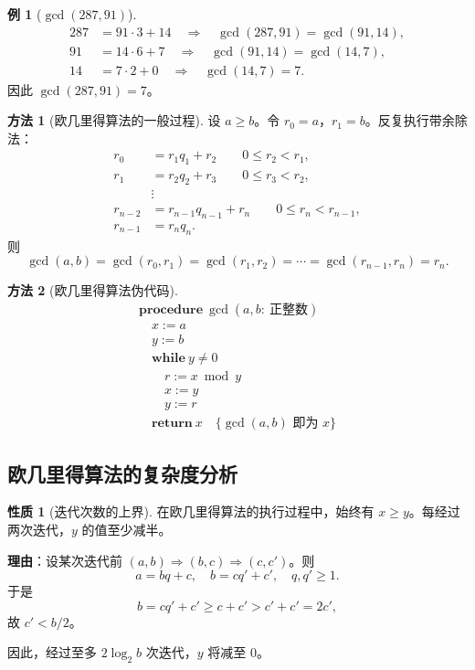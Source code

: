 \documentclass[UTF8,11pt,a4paper]{ctexbook}   %
\theoremstyle{definition}
\newtheorem{example}{例}[section]
\newtheorem{property}{性质}[section]
\newtheorem{method}{方法}[section]
\begin{document}
\begin{example}[$\gcd(287,91)$]
\begin{align*}
287 &= 91\cdot 3 + 14 \quad\Rightarrow\quad \gcd(287,91)=\gcd(91,14),\\
91 &= 14\cdot 6 + 7 \quad\Rightarrow\quad \gcd(91,14)=\gcd(14,7),\\
14 &= 7\cdot 2 + 0 \quad\Rightarrow\quad \gcd(14,7)=7.
\end{align*}
因此 $\gcd(287,91)=7$。
\end{example}

\begin{method}[欧几里得算法的一般过程]
设 $a\ge b$。令 $r_0=a$，$r_1=b$。反复执行带余除法：
\begin{align*}
r_0 &= r_1 q_1 + r_2 \qquad 0\le r_2 < r_1,\\
r_1 &= r_2 q_2 + r_3 \qquad 0\le r_3 < r_2,\\
&\vdots\\
r_{n-2} &= r_{n-1} q_{n-1} + r_n \qquad 0\le r_n < r_{n-1},\\
r_{n-1} &= r_n q_n.
\end{align*}
则
\[
\gcd(a,b)=\gcd(r_0,r_1)=\gcd(r_1,r_2)=\cdots=\gcd(r_{n-1},r_n)=r_n.
\]
\end{method}

\begin{method}[欧几里得算法伪代码]
\[
\begin{array}{l}
\textbf{procedure}\ \gcd(a,b:\ \text{正整数})\\
\quad x := a\\
\quad y := b\\
\quad \textbf{while}\ y \neq 0\\
\quad \quad r := x \bmod y\\
\quad \quad x := y\\
\quad \quad y := r\\
\quad \textbf{return}\ x\quad\{\gcd(a,b)\text{ 即为 }x\}
\end{array}
\]
\end{method}

\subsection{欧几里得算法的复杂度分析}

\begin{property}[迭代次数的上界]
在欧几里得算法的执行过程中，始终有 $x\ge y$。每经过两次迭代，$y$ 的值至少减半。

\textbf{理由}：设某次迭代前 $(a,b)\Rightarrow(b,c)\Rightarrow(c,c')$。则
\[
a = bq + c,\quad b = cq' + c',\quad q,q'\ge 1.
\]
于是
\[
b = cq' + c' \ge c + c' > c' + c' = 2c',
\]
故 $c' < b/2$。

因此，经过至多 $2\log_2 b$ 次迭代，$y$ 将减至 $0$。
\end{property}
\end{document}
